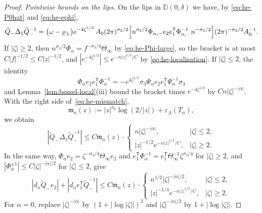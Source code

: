\begin{proof}
\emph{Pointwise bounds on the lips.} On the lips in $\mathbb D(0,\delta)$ we have, by \eqref{eq:he-P0hat} and \eqref{eq:he-ephi},
\[
  \tilde Q_-\Delta_1\tilde Q_-^{-1}=\bigl(\omega-\varrho_\pm\bigr)e^{-4\zeta^{1/2}}\,A_0(2\pi)^{\sigma_3/2}
  \Bigl[n^{\sigma_3/2}\Phi_{\alpha,-}e_2e_1^{\mathsf T}\Phi_{\alpha,-}^{-1}n^{-\sigma_3/2}\Bigr](2\pi)^{-\sigma_3/2}A_0^{-1}.
\]
If $|\zeta|\ge2$, then $n^{\sigma_3/2}\Phi_\alpha=f^{-\sigma_3/4}\Theta_\infty$ by \eqref{eq:he-Phi-large}, so the bracket
is at most $C|f|^{-1/2}\le C|z|^{-1/2}$, and $|e^{-4\zeta^{1/2}}|\le e^{-n|z|^{1/2}/C}$ by \eqref{eq:he-localisation}. If
$|\zeta|\le2$, the identity
\[
  \Phi_\alpha e_2e_1^{\mathsf T}\Phi_\alpha^{-1}=-e^{4\zeta^{1/2}}\sigma_3\Psi_\alpha e_2e_1^{\mathsf T}\Psi_\alpha^{-1}\sigma_3
\]
and Lemma~\ref{lem:bessel-local}(iii) bound the bracket times $e^{-4\zeta^{1/2}}$ by
$Cn|\zeta|^{-|\alpha|}$. With the right side of~\eqref{eq:he-mismatch},
\[
  \mathfrak m_n(z):=|z|^{\nu_p}\log(2/|z|)+\varepsilon_\Lambda(T_n),
\]
we obtain
\begin{equation}\label{eq:he-main-bound}
  |\tilde Q_-\Delta_1\tilde Q_-^{-1}|\le C\mathfrak m_n(z)\cdot\begin{cases}n|\zeta|^{-|\alpha|},&|\zeta|\le2,\\
  |z|^{-1/2}e^{-n|z|^{1/2}/C},&|\zeta|\ge2.\end{cases}
\end{equation}
In the same way, $\Phi_\alpha e_2=\zeta^{-\sigma_3/4}\Theta_\infty e_2$ and $e_1^{\mathsf T}\Phi_\alpha^{-1}=e_1^{\mathsf T}
\Theta_\infty^{-1}\zeta^{\sigma_3/4}$ for $|\zeta|\ge2$, and $|\Phi_\alpha^{\pm1}|\le C|\zeta|^{-|\alpha|/2}$ for
$|\zeta|\le2$, give
\begin{equation}\label{eq:he-column-bound}
  |d_n\tilde Q_-e_2|+|d_ne_1^{\mathsf T}\tilde Q_-^{-1}|\le C\mathfrak m_n(z)\cdot\begin{cases}n^{1/2}|\zeta|^{-|\alpha|/2},&|\zeta|\le2,\\
  |z|^{-1/4}e^{-n|z|^{1/2}/C},&|\zeta|\ge2.\end{cases}
\end{equation}
For $\alpha=0$, replace $|\zeta|^{-|\alpha|}$ by $(1+|\log|\zeta||)^2$ and $|\zeta|^{-|\alpha|/2}$ by
$1+|\log|\zeta||$.


\end{proof}
